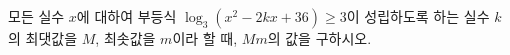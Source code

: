 모든 실수 $x$에 대하여 부등식 $\log_3 (x^2-2kx+36)\ge 3$이 성립하도록 하는 실수 $k$의 최댓값을 $M$, 최솟값을 $m$이라 할 때, $Mm$의 값을 구하시오. 
